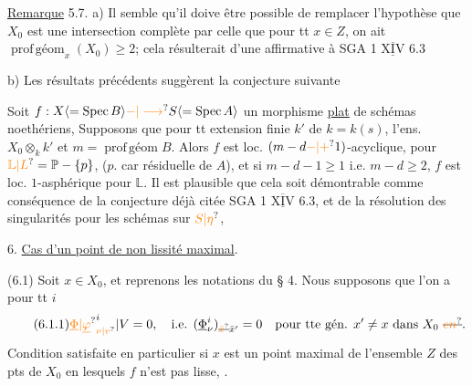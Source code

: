 \uline{Remarque} 5.7. a) Il semble qu'il doive être possible de remplacer l'hypothèse que $X_0$ est une intersection complète par celle que pour tt $x\in Z$, on ait $\operatorname{prof\,géom}_x(X_0)\geq2$; cela résulterait d'une  affirmative à SGA 1 $\overline{\underline{\mathrm{XIV}}}$ 6.3

b) Les résultats précédents suggèrent la conjecture suivante 

Soit $f:X\inserted{=\operatorname{Spec}B}\unsure{-|\longrightarrow}S\inserted{=\operatorname{Spec}A}$ un morphisme \uline{plat} de schémas noethériens,    Supposons que  pour tt extension finie $k'$ de $k=k(s)$, l'ens.  $X_0\otimes_k k'$   et $m=\operatorname{prof\,géom}B$. Alors $f$ est loc. $(m-d\unsure{-|+}1)$-acyclique,  pour $\unsure{\mathbb{L}|L}=\mathbb{P}-\{p\}$, ($p$. car résiduelle de $A$), et si $m-d-1\geq1$ i.e. $m-d\geq2$, $f$ est loc. $1$-asphérique pour $\mathbb{L}$.  Il est plausible que cela soit démontrable comme conséquence de la conjecture déjà citée SGA 1 $\overline{\underline{\mathrm{XIV}}}$ 6.3, et de la résolution des singularités pour les schémas  sur $\unsure{S|\eta}$,

6. \uline{Cas d'un point de non lissité  maximal}. 

(6.1) Soit $x\in X_0$, et  reprenons les notations du § 4. Nous supposons que l'on a pour tt $i$
\[
\tag*{(6.1.1)}
{\unsure{\underline{\Phi}|\underline{\varphi}}}^i_{\unsure{\nu|v}}|V=0,\quad\text{i.e. }(\underline{\Phi}^i_\nu)_{\deleted{\unsure{\bar{x}}}\bar{x}'}=0\quad\text{pour tte gén. }x'\ne x\text{ dans }X_0\ \deleted{\unsure{en}}.
\]
Condition satisfaite en particulier si $x$ est un point maximal de l'ensemble $Z$ des pts de $X_0$ en lesquels $f$ n'est pas lisse, .

